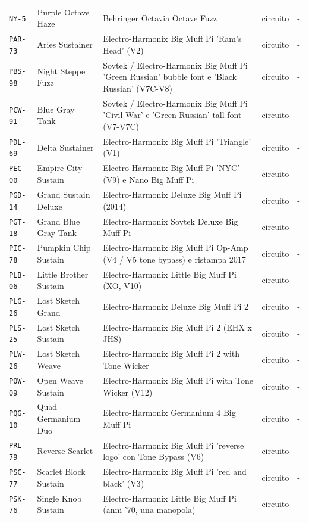 \begin{xltabular}{\linewidth}{@{}l l X l l@{}}
\texttt{NY-5} & Purple Octave Haze & Behringer Octavia Octave Fuzz & circuito & -\\
\texttt{PAR-73} & Aries Sustainer & Electro-Harmonix Big Muff Pi 'Ram's Head' (V2) & circuito & -\\
\texttt{PBS-98} & Night Steppe Fuzz & Sovtek / Electro-Harmonix Big Muff Pi 'Green Russian' bubble font e 'Black Russian' (V7C-V8) & circuito & -\\
\texttt{PCW-91} & Blue Gray Tank & Sovtek / Electro-Harmonix Big Muff Pi 'Civil War' e 'Green Russian' tall font (V7-V7C) & circuito & -\\
\texttt{PDL-69} & Delta Sustainer & Electro-Harmonix Big Muff Pi 'Triangle' (V1) & circuito & -\\
\texttt{PEC-00} & Empire City Sustain & Electro-Harmonix Big Muff Pi 'NYC' (V9) e Nano Big Muff Pi & circuito & -\\
\texttt{PGD-14} & Grand Sustain Deluxe & Electro-Harmonix Deluxe Big Muff Pi (2014) & circuito & -\\
\texttt{PGT-18} & Grand Blue Gray Tank & Electro-Harmonix Sovtek Deluxe Big Muff Pi & circuito & -\\
\texttt{PIC-78} & Pumpkin Chip Sustain & Electro-Harmonix Big Muff Pi Op-Amp (V4 / V5 tone bypass) e ristampa 2017 & circuito & -\\
\texttt{PLB-06} & Little Brother Sustain & Electro-Harmonix Little Big Muff Pi (XO, V10) & circuito & -\\
\texttt{PLG-26} & Lost Sketch Grand & Electro-Harmonix Deluxe Big Muff Pi 2 & circuito & -\\
\texttt{PLS-25} & Lost Sketch Sustain & Electro-Harmonix Big Muff Pi 2 (EHX x JHS) & circuito & -\\
\texttt{PLW-26} & Lost Sketch Weave & Electro-Harmonix Big Muff Pi 2 with Tone Wicker & circuito & -\\
\texttt{POW-09} & Open Weave Sustain & Electro-Harmonix Big Muff Pi with Tone Wicker (V12) & circuito & -\\
\texttt{PQG-10} & Quad Germanium Duo & Electro-Harmonix Germanium 4 Big Muff Pi & circuito & -\\
\texttt{PRL-79} & Reverse Scarlet & Electro-Harmonix Big Muff Pi 'reverse logo' con Tone Bypass (V6) & circuito & -\\
\texttt{PSC-77} & Scarlet Block Sustain & Electro-Harmonix Big Muff Pi 'red and black' (V3) & circuito & -\\
\texttt{PSK-76} & Single Knob Sustain & Electro-Harmonix Little Big Muff Pi (anni '70, una manopola) & circuito & -\\

\end{xltabular}

